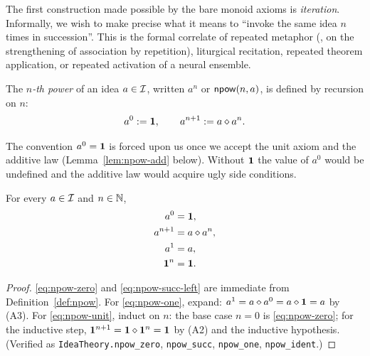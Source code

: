 The first construction made possible by the bare monoid axioms is
\emph{iteration}.  Informally, we wish to make precise what it means to
``invoke the same idea $n$ times in succession''.  This is the formal
correlate of repeated metaphor (\cite{Hume1739}, on the strengthening of
association by repetition), liturgical recitation, repeated theorem
application, or repeated activation of a neural ensemble.

\begin{definition}\label{def:npow}
The \emph{$n$-th power} of an idea $a \in \mathcal{I}$, written $a^n$ or
$\mathsf{npow}(n,a)$, is defined by recursion on $n$:
\begin{equation}\label{eq:npow-def}
a^0 \mathrel{:=} \mathbf{1},
\qquad
a^{n+1} \mathrel{:=} a \mathbin{\diamond} a^n.
\end{equation}
\end{definition}

\begin{remark}
The convention $a^0 = \mathbf{1}$ is forced upon us once we accept the unit
axiom and the additive law (Lemma~\ref{lem:npow-add} below).  Without
$\mathbf{1}$ the value of $a^0$ would be undefined and the additive law would
acquire ugly side conditions.
\end{remark}

\begin{lemma}\label{lem:npow-elem}
For every $a \in \mathcal{I}$ and $n \in \mathbb{N}$,
\begin{align}
a^0 &= \mathbf{1},
\label{eq:npow-zero} \\
a^{n+1} &= a \mathbin{\diamond} a^n,
\label{eq:npow-succ-left} \\
a^1 &= a,
\label{eq:npow-one} \\
\mathbf{1}^n &= \mathbf{1}.
\label{eq:npow-unit}
\end{align}
\end{lemma}

\begin{proof}
\eqref{eq:npow-zero} and \eqref{eq:npow-succ-left} are immediate from
Definition~\ref{def:npow}.  For \eqref{eq:npow-one}, expand:
$a^1 = a \mathbin{\diamond} a^0 = a \mathbin{\diamond} \mathbf{1} = a$ by (A3).  For
\eqref{eq:npow-unit}, induct on $n$: the base case $n = 0$ is
\eqref{eq:npow-zero}; for the inductive step, $\mathbf{1}^{n+1} = \mathbf{1} \mathbin{\diamond}
\mathbf{1}^n = \mathbf{1}$ by (A2) and the inductive hypothesis.
(Verified as \texttt{IdeaTheory.npow\_zero}, \texttt{npow\_succ},
\texttt{npow\_one}, \texttt{npow\_ident}.)
\end{proof}

